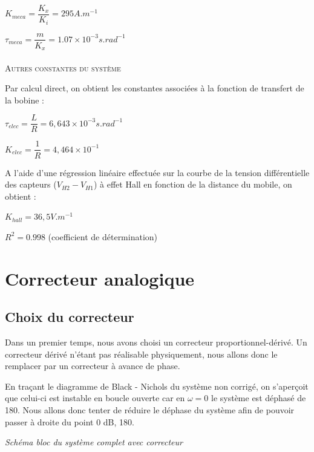 \documentclass[11pt, french]{article} %
\begin{document}
\medskip
$  K_{meca} = \dfrac {K_x}{K_i} =  295 A.m^{-1} $

\medskip
$  \tau_{meca} = \dfrac m {K_x} = 1.07 \times 10^{-3} s.rad^{-1} $

\paragraph{}
\textsc{Autres constantes du système}

\noindent
Par calcul direct, on obtient les constantes associées à la fonction de transfert de la bobine :

\medskip
$  \tau_{elec} = \dfrac L R = 6,643 \times 10^{-3} s.rad^{-1} $

\medskip
$  K_{elec} = \dfrac 1 R = 4,464 \times 10^{-1} $
\medskip

\noindent
A l'aide d'une régression linéaire effectuée sur la courbe de la tension différentielle des capteurs ($ V_{H2} - V_{H1} $) à effet Hall en fonction de la distance du mobile, on obtient :

\medskip
$  K_{hall} = 36,5 V.m^{-1} $

\medskip
$ R^2 = 0.998 $ (coefficient de détermination)
\medskip

\section{Correcteur analogique}
\subsection{Choix du correcteur}
Dans un premier temps, nous avons choisi un correcteur proportionnel-dérivé. Un correcteur dérivé n'étant pas réalisable physiquement, nous allons donc le remplacer par un correcteur à avance de phase.

\medskip
En traçant le diagramme de Black - Nichols du système non corrigé, on s'aperçoit que celui-ci est instable en boucle ouverte car en $\omega = 0$ le système est déphasé de 180. Nous allons donc tenter de réduire le déphase du système afin de pouvoir passer à droite du point 0 dB, 180.

\medskip
\begin{center}

\emph{Schéma bloc du système complet avec correcteur}
\end{center}
\begin{quote}

%

\end{quote}
\end{document}
